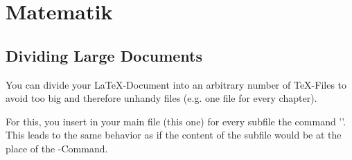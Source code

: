 \chapter{Matematik}


\section{Dividing Large Documents}\label{dividing}
You can divide your \LaTeX-Document into an arbitrary number of \TeX-Files
to avoid too big and therefore unhandy files (e.g. one file for every chapter).

For this, you insert in your main file (this one) for every subfile
the command '\verb##'. This leads to the same behavior
as if the content of the subfile would be at the place of the \verb##-Command.

